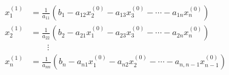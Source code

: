 \documentclass[A4,11pt]{article}
\begin{document}
\thispagestyle{empty}
\begin{align*}
x_1^{(1)} &= \frac{1}{a_{11}}(b_1 - a_{12}x_2^{(0)} - a_{13}x_3^{(0)} - \cdots - a_{1n}x_n^{(0)})\\
x_2^{(1)} &= \frac{1}{a_{22}}(b_2 - a_{21}x_1^{(0)} - a_{23}x_3^{(0)} - \cdots - a_{2n}x_n^{(0)})\\
    & \qquad \vdots \\                                                                          
x_n^{(1)} &= \frac{1}{a_{nn}}(b_n - a_{n1}x_1^{(0)} - a_{n2}x_2^{(0)} - \cdots - a_{n,n-1}x_{n-1}^{(0)})
\end{align*}
\end{document}
